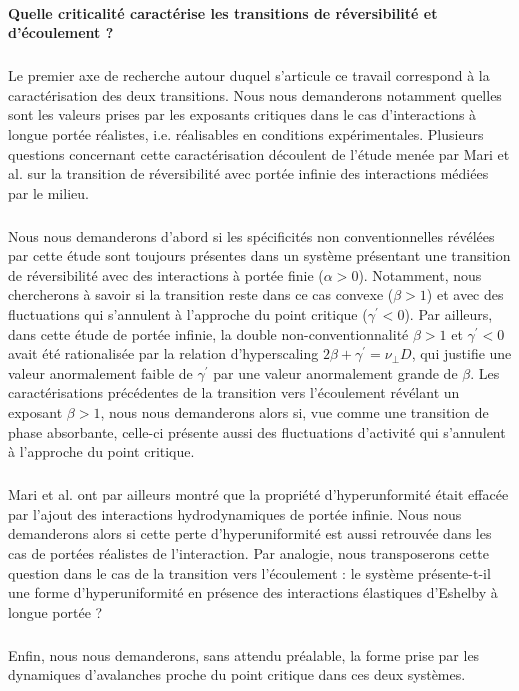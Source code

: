 \paragraph{Quelle criticalité caractérise les transitions de réversibilité et d'écoulement ?}

\subparagraph{}Le premier axe de recherche autour duquel s'articule ce travail correspond à la caractérisation des deux transitions. Nous nous demanderons notamment quelles sont les valeurs prises par les exposants critiques dans le cas d'interactions à longue portée réalistes, i.e. réalisables en conditions expérimentales. Plusieurs questions concernant cette caractérisation découlent de l'étude menée par Mari et al. \cite{mari_absorbing_2022} sur la transition de réversibilité avec portée infinie des interactions médiées par le milieu. 

\subparagraph{}Nous nous demanderons d'abord si les spécificités non conventionnelles révélées par cette étude sont toujours présentes dans un système présentant une transition de réversibilité avec des interactions à portée finie ($\alpha > 0$). Notamment, nous chercherons à savoir si la transition reste dans ce cas convexe ($\beta >1$) et avec des fluctuations qui s'annulent à l'approche du point critique ($\gamma^\prime < 0$). Par ailleurs, dans cette étude de portée infinie, la double non-conventionnalité $\beta >1$ et $\gamma^\prime < 0$ avait été rationalisée par la relation d'hyperscaling $2\beta + \gamma^\prime = \nu_\perp D$, qui justifie une valeur anormalement faible de $\gamma^\prime$ par une valeur anormalement grande de $\beta$. Les caractérisations précédentes de la transition vers l'écoulement révélant un exposant $\beta >1$, nous nous demanderons alors si, vue comme une transition de phase absorbante, celle-ci présente aussi des fluctuations d'activité qui s'annulent à l'approche du point critique.

\subparagraph{}Mari et al. ont par ailleurs montré que la propriété d'hyperunformité était effacée par l'ajout des interactions hydrodynamiques de portée infinie. Nous nous demanderons alors si cette perte d'hyperuniformité est aussi retrouvée dans les cas de portées réalistes de l'interaction. Par analogie, nous transposerons cette question dans le cas de la transition vers l'écoulement : le système présente-t-il une forme d'hyperuniformité en présence des interactions élastiques d'Eshelby à longue portée ?

\subparagraph{}Enfin, nous nous demanderons, sans attendu préalable, la forme prise par les dynamiques d'avalanches proche du point critique dans ces deux systèmes.

